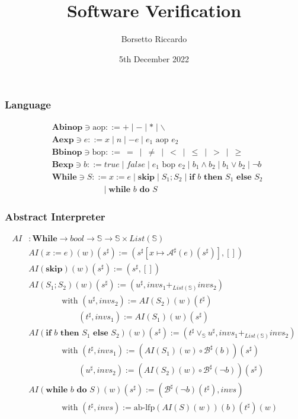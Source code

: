 \documentclass{beamer}
\title{Software Verification}
\author{Borsetto Riccardo}
\institute{Univerisità degli Studi di Padova}
\date{5th December 2022}
\begin{document}
\frame{\titlepage}


\begin{frame}
    \frametitle{Language}
        \begin{align*}
        &\mathbf { Abinop } \ni \text{aop}::= + \mid - \mid * \mid \backslash  \\
        &\mathbf { Aexp } \ni e::= x \mid n \mid -e \mid e_1 \text { aop } e_2 \\
        &\mathbf { Bbinop } \ni \text{bop}::= \ =\ \mid\ \ne\ \mid\ <\ \mid\ \le\ \mid\ > \ \mid\ \ge\\
        & \mathbf { Bexp } \ni b::=  true  \mid false \mid e_1 \text{ bop } e_2 \mid b_1 \wedge b_2 \mid b_1 \vee b_2 \mid \neg b \\
        & \mathbf { While } \ni S::= x:=e \mid \textbf {skip} \mid S_1 ; S_2 \mid \textbf {if } b \textbf { then } S_1 \textbf { else } S_2\\
         &\qquad \qquad \qquad \mid \textbf {while } b \textbf { do } S
        \end{align*}
\end{frame}


\begin{frame}
    \frametitle{Abstract Interpreter}
\begin{align*}
AI&: \mathbf { While } \to bool \rightarrow \mathbb{S} \rightarrow \mathbb{S} \times List(\mathbb{S}) \\
&AI (x:=e) (w) (s^{\sharp}) := (s^{\sharp}[x \mapsto \mathcal{A}^{\sharp} (e) (s^{\sharp})], []) \\
&AI (\textbf{skip}) (w) (s^{\sharp}) := (s^{\sharp}, []) \\
&AI (S_1 ; S_2) (w) (s^{\sharp}) := (u^{\sharp}, invs_1 +_{List(\mathbb{S})} invs_2) \\
& \qquad \qquad \text{with } (u^{\sharp}, invs_2) := AI (S_2) (w) (t^{\sharp}) \\
& \qquad \qquad \qquad (t^{\sharp}, invs_1) := AI (S_1) (w) (s^{\sharp}) \\
&AI (\textbf {if } b \textbf { then } S_1 \textbf { else } S_2) (w) (s^{\sharp}) := (t^{\sharp} \vee_{\mathbb{S}} u^{\sharp}, invs_1 +_{List(\mathbb{S})} invs_2) \\
& \qquad \qquad \text{with } (t^{\sharp}, invs_1) := (AI ( S_1 ) (w) \circ \mathcal{B}^{\sharp} ( b )) (s^{\sharp}) \\
& \qquad \qquad \qquad (u^{\sharp}, invs_2) := (AI ( S_2 ) (w) \circ \mathcal{B}^{\sharp} ( \neg b )) (s^{\sharp}) \\
&AI (\textbf {while } b \textbf { do } S) (w) (s^{\sharp}) := (\mathcal{B}^{\sharp} ( \neg b ) (t^{\sharp}), invs)\\
& \qquad \qquad \text{with } (t^{\sharp}, invs) := \text{ab-lfp} (AI ( S ) (w)) (b) (t^{\sharp}) (w)
\end{align*}
\end{frame}
\end{document}
